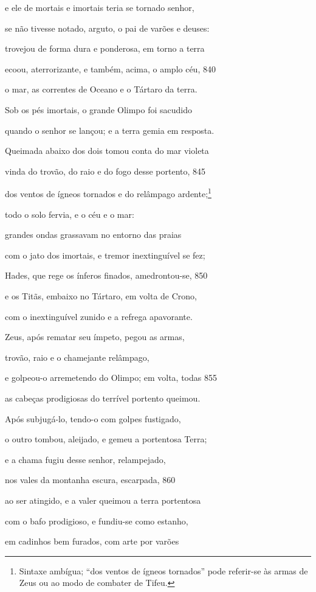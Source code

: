 e ele de mortais e imortais teria se tornado senhor,

se não tivesse notado, arguto, o pai de varões e deuses:

trovejou de forma dura e ponderosa, em torno a terra

ecoou, aterrorizante, e também, acima, o amplo céu, \num{840}

o mar, as correntes de Oceano e o Tártaro da terra.

Sob os pés imortais, o grande Olimpo foi sacudido

quando o senhor se lançou; e a terra gemia em resposta.

Queimada abaixo dos dois tomou conta do mar violeta

vinda do trovão, do raio e do fogo desse portento, \num{845}

dos ventos de ígneos tornados e do relâmpago ardente;\footnote{Sintaxe ambígua; ``dos ventos de ígneos tornados'' pode referir-se às armas de Zeus ou ao modo de combater de Tifeu.}

todo o solo fervia, e o céu e o mar:

grandes ondas grassavam no entorno das praias

com o jato dos imortais, e tremor inextinguível se fez;

Hades, que rege os ínferos finados, amedrontou-se, \num{850}

e os Titãs, embaixo no Tártaro, em volta de Crono,

com o inextinguível zunido e a refrega apavorante.

\quad{}Zeus, após rematar seu ímpeto, pegou as armas,

trovão, raio e o chamejante relâmpago,

e golpeou-o arremetendo do Olimpo; em volta, todas \num{855}

as cabeças prodigiosas do terrível portento queimou.

Após subjugá-lo, tendo-o com golpes fustigado,

o outro tombou, aleijado, e gemeu a portentosa Terra;

e a chama fugiu desse senhor, relampejado,

nos vales da montanha escura, escarpada, \num{860}

ao ser atingido, e a valer queimou a terra portentosa

com o bafo prodigioso, e fundiu-se como estanho,

em cadinhos bem furados, com arte por varões

